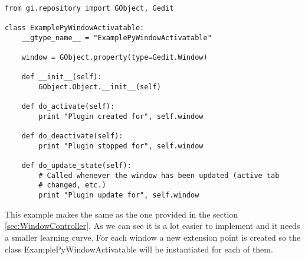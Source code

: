 \begin{lstlisting}[style=python]

from gi.repository import GObject, Gedit

class ExamplePyWindowActivatable:
    __gtype_name__ = "ExamplePyWindowActivatable"

    window = GObject.property(type=Gedit.Window)

    def __init__(self):
        GObject.Object.__init__(self)

    def do_activate(self):
        print "Plugin created for", self.window

    def do_deactivate(self):
        print "Plugin stopped for", self.window

    def do_update_state(self):
        # Called whenever the window has been updated (active tab
        # changed, etc.)
        print "Plugin update for", self.window

\end{lstlisting}

This example makes the same as the one provided in the section \ref{sec:WindowController}. As we can see it is a lot easier to implement and it needs a smaller learning curve. For each window a new extension point is created so the class ExamplePyWindowActivatable will be instantiated for each of them.

